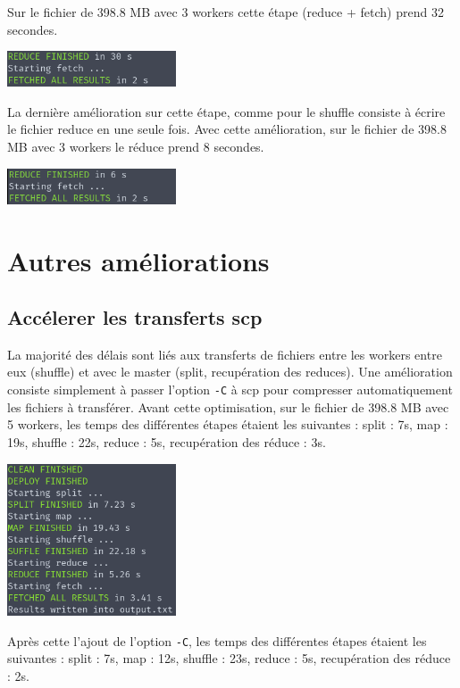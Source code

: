 \documentclass[11pt,a4paper]{article}
\begin{document}
Sur le fichier de 398.8 MB avec 3 workers cette étape (reduce + fetch) prend 32 secondes.

\includegraphics[width=5cm]{screenshot_reduce3.png}

La dernière amélioration sur cette étape, comme pour le shuffle consiste à écrire le fichier reduce en une seule fois. Avec cette amélioration, sur le fichier de 398.8 MB avec 3 workers le réduce prend 8 secondes.

\includegraphics[width=5cm]{screenshot_reduce4.png}

\section{Autres améliorations}
\subsection*{Accélerer les transferts scp}
La majorité des délais sont liés aux transferts de fichiers entre les workers entre eux (shuffle) et avec le master (split, recupération des reduces). Une amélioration consiste simplement à passer l'option \texttt{-C} à scp pour compresser automatiquement les fichiers à transférer. Avant cette optimisation, sur le fichier de 398.8 MB avec 5 workers, les temps des différentes étapes étaient les suivantes : split : 7s, map : 19s, shuffle : 22s, reduce : 5s, recupération des réduce : 3s.

\includegraphics[width=5cm]{screenshot8.png}

Après cette l'ajout de l'option \texttt{-C}, les temps des différentes étapes étaient les suivantes : split : 7s, map : 12s, shuffle : 23s, reduce : 5s, recupération des réduce : 2s.
\end{document}
